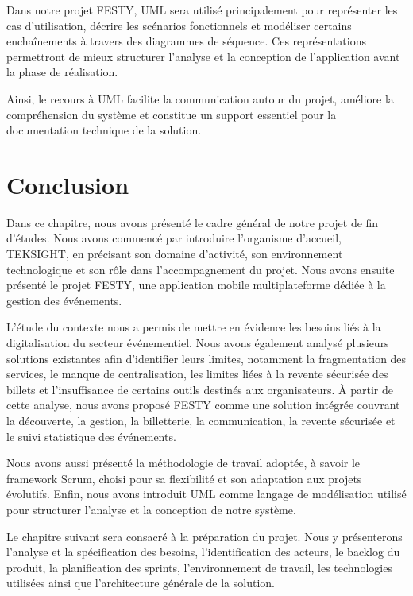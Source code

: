 Dans notre projet FESTY, UML sera utilisé principalement pour représenter les cas d'utilisation, décrire les scénarios fonctionnels et modéliser certains enchaînements à travers des diagrammes de séquence. Ces représentations permettront de mieux structurer l'analyse et la conception de l'application avant la phase de réalisation.

Ainsi, le recours à UML facilite la communication autour du projet, améliore la compréhension du système et constitue un support essentiel pour la documentation technique de la solution.

\section{Conclusion}

Dans ce chapitre, nous avons présenté le cadre général de notre projet de fin d'études. Nous avons commencé par introduire l'organisme d'accueil, TEKSIGHT, en précisant son domaine d'activité, son environnement technologique et son rôle dans l'accompagnement du projet. Nous avons ensuite présenté le projet FESTY, une application mobile multiplateforme dédiée à la gestion des événements.

L'étude du contexte nous a permis de mettre en évidence les besoins liés à la digitalisation du secteur événementiel. Nous avons également analysé plusieurs solutions existantes afin d'identifier leurs limites, notamment la fragmentation des services, le manque de centralisation, les limites liées à la revente sécurisée des billets et l'insuffisance de certains outils destinés aux organisateurs. À partir de cette analyse, nous avons proposé FESTY comme une solution intégrée couvrant la découverte, la gestion, la billetterie, la communication, la revente sécurisée et le suivi statistique des événements.

Nous avons aussi présenté la méthodologie de travail adoptée, à savoir le framework Scrum, choisi pour sa flexibilité et son adaptation aux projets évolutifs. Enfin, nous avons introduit UML comme langage de modélisation utilisé pour structurer l'analyse et la conception de notre système.

Le chapitre suivant sera consacré à la préparation du projet. Nous y présenterons l'analyse et la spécification des besoins, l'identification des acteurs, le backlog du produit, la planification des sprints, l'environnement de travail, les technologies utilisées ainsi que l'architecture générale de la solution.
